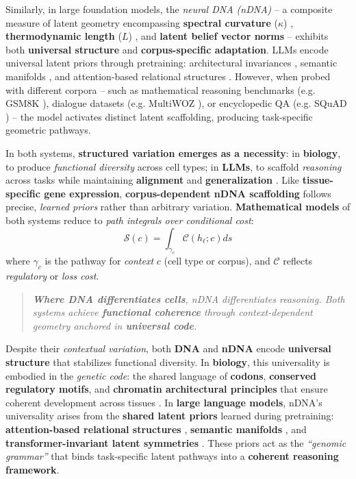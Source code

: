 Similarly, in large foundation models, the \emph{neural DNA (nDNA)} -- a composite measure of latent geometry encompassing \textbf{spectral curvature} ($\kappa$) \citep{belkin2019reconciling}, 
\textbf{thermodynamic length} ($L$) \citep{still2012thermodynamic}, 
and \textbf{latent belief vector norms} \citep{olah2020zoom} -- exhibits both \textbf{universal structure} and \textbf{corpus-specific adaptation}. 
LLMs encode universal latent priors through pretraining: architectural invariances \citep{vaswani2017attention}, semantic manifolds \citep{mikolov2013distributed, bommasani2021opportunities}, and attention-based relational structures \citep{geva2021transformer}. 
However, when probed with different corpora -- such as mathematical reasoning benchmarks (e.g. GSM8K \citep{cobbe2021training}), dialogue datasets (e.g. MultiWOZ \citep{budzianowski2018multiwoz}), or encyclopedic QA (e.g. SQuAD \citep{rajpurkar2016squad}) -- 
the model activates distinct latent scaffolding, producing task-specific geometric pathways.



In both systems, \textbf{structured variation emerges as a necessity}: 
in \textbf{biology}, to produce \emph{functional diversity} across cell types; 
in \textbf{LLMs}, to scaffold \emph{reasoning} across tasks while maintaining \textbf{alignment} and \textbf{generalization} \citep{bommasani2021opportunities, cobbe2021training}. 
Like \textbf{tissue-specific gene expression}, \textbf{corpus-dependent nDNA scaffolding} follows precise, \emph{learned priors} rather than arbitrary variation. 
\textbf{Mathematical models} of both systems reduce to \emph{path integrals over conditional cost}: 
\[
\mathcal{S}(c) = \int_{\gamma_c} \mathcal{C}(h_\ell; c) ds
\]
where $\gamma_c$ is the pathway for \emph{context} $c$ (cell type or corpus), and $\mathcal{C}$ reflects \emph{regulatory} or \emph{loss cost}.

\vspace{-2mm}
\begin{quote}
\emph{\textbf{Where DNA differentiates cells}, nDNA differentiates reasoning. Both systems achieve \textbf{functional coherence} through context-dependent geometry anchored in \textbf{universal code}.}
\end{quote}

Despite their \emph{contextual variation}, both \textbf{DNA} and \textbf{nDNA} encode \textbf{universal structure} that stabilizes functional diversity. 
In \textbf{biology}, this universality is embodied in the \emph{genetic code}: the shared language of \textbf{codons}, \textbf{conserved regulatory motifs}, and \textbf{chromatin architectural principles} that ensure coherent development across tissues \citep{lewin2013genes, alberts2014molecular}. 
In \textbf{large language models}, nDNA’s universality arises from the \textbf{shared latent priors} learned during pretraining: \textbf{attention-based relational structures} \citep{vaswani2017attention}, \textbf{semantic manifolds} \citep{mikolov2013distributed}, and \textbf{transformer-invariant latent symmetries} \citep{bommasani2021opportunities}. 
These priors act as the \emph{``genomic grammar''} that binds task-specific latent pathways into a \textbf{coherent reasoning framework}.

